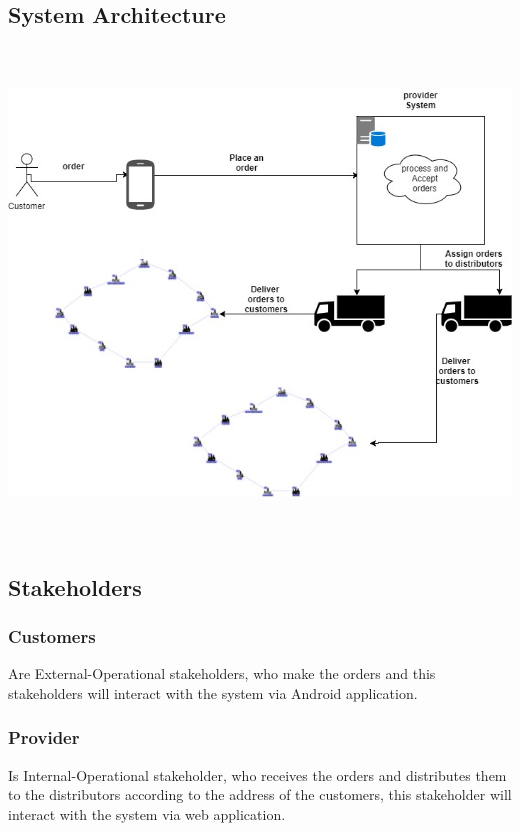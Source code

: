 \documentclass[12pt]{article}
\begin{document}
\subsection{ System Architecture }
\begin{center}
	\includegraphics[width=16cm,height=13cm]{./assets/systemarchitecture/system-architecture.png}\\
\end{center}
\newpage

\subsection{ Stakeholders }

\subsubsection{  Customers }
Are External-Operational stakeholders, who make the orders and this stakeholders will interact with the system via Android application.

\subsubsection{  Provider }
Is Internal-Operational stakeholder, who receives the orders and distributes them to the distributors according to the address of the customers, this stakeholder will interact with the system via web application.
\end{document}
